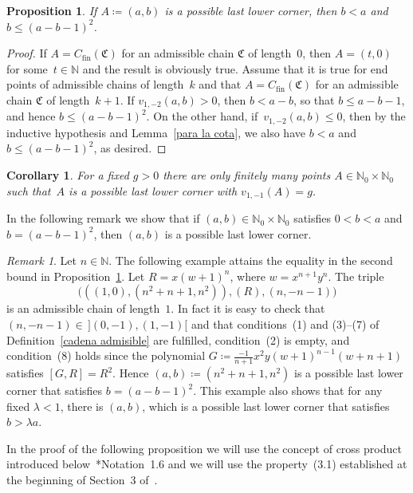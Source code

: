 \documentclass[reqno,a4paper]{amsart}
\newtheorem{proposition}[theorem]{Proposition}
\newtheorem{corollary}[theorem]{Corollary}
\theoremstyle{definition}
\theoremstyle{remark}
\newtheorem{remark}[theorem]{Remark}
\begin{document}
\begin{proposition}\label{cota} If $A\coloneqq (a,b)$ is a possible last lower corner, then $b<a$ and $b\le (a - b - 1)^2$.
\end{proposition}

\begin{proof} If $A=C_{\text{fin}}(\mathfrak{C})$ for an admissible chain $\mathfrak{C}$ of length~$0$, then $A=(t,0)$ for some~$t\in \mathds{N}$ and the result is obviously true. Assume that it is true for end points of  admissible chains of length~$k$ and that $A=C_{\text{fin}}(\mathfrak{C})$ for an admissible chain $\mathfrak{C}$ of length~$k+1$. If $v_{1,-2}(a,b)>0$, then $b<a - b$, so that $b\le a - b-1$, and hence $b\le (a - b-1)^2$.  On the other hand, if~$v_{1,-2}(a,b)\le 0$, then by the inductive hypothesis and Lemma~\ref{para la cota}, we also have $b<a$ and~$b\le (a - b - 1)^2$, as desired.
\end{proof}

\begin{corollary} For a fixed $g>0$ there are only finitely many points $A\in \mathds{N}_0\times \mathds{N}_0$ such that~$A$ is a possible last lower corner with $v_{1,-1}(A)=g$.
\end{corollary}

In the following remark we show that if $(a,b)\in \mathds{N}_0\times \mathds{N}_0$ satisfies $0<b<a$ and $b = (a-b-1)^2$, then $(a,b)$ is a possible last lower corner.

\begin{remark}\label{caso 2} Let $n\in\mathds{N}$. The following example attains the equality in the second bound in Proposition~\ref{cota}. Let $R=x(w+1)^n$, where $w=x^{n+1}y^n$. The triple
$$
\bigl(((1,0),(n^2+n+1,n^2)),(R),(n,-n-1)\bigr)
$$
is an admissible chain of length~$1$. In fact it is easy to check that $(n,-n-1)\in \hspace{2pt} ](0,-1),(1,-1)[$ and that conditions~(1) and (3)--(7) of Definition~\ref{cadena admisible} are fulfilled, condition~(2) is empty, and condition~(8) holds since the polynomial $G\coloneqq \frac{-1}{n+1}x^2 y(w+1)^{n-1}(w+n+1)$ satisfies $[G,R]=R^2$. Hence $(a,b) \coloneqq (n^2+n+1,n^2)$ is a possible last lower corner that satisfies $b = (a - b - 1)^2$. This example also shows that for any fixed $\lambda<1$, there is $(a,b)$, which is a possible last lower corner that satisfies $b>\lambda a$.
\end{remark}

In the proof of the following proposition we will use the concept of cross product introduced below~\cite{GGV}*{Notation~1.6} and we will use the property~(3.1) established at the beginning of Section~3 of~\cite{GGV}.
\end{document}

